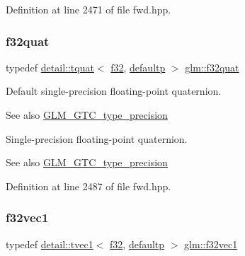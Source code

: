 Definition at line 2471 of file fwd.\+hpp.

\mbox{\label{group__gtc__type__precision_gafc69e0f1b9ac1a001bb4b1b9710d4f92}} 
\subsubsection{\texorpdfstring{f32quat}{f32quat}}
{\footnotesize\ttfamily typedef \hyperlink{structglm_1_1detail_1_1tquat}{detail\+::tquat}$<$ \hyperlink{group__gtc__type__precision_ga0ec999b57f5330d9021256e96038df04}{f32}, \hyperlink{namespaceglm_a0f04f086094c747d227af4425893f545a9d21ccd8b5a009ec7eb7677befc3bf51}{defaultp} $>$ \hyperlink{group__gtc__type__precision_gafc69e0f1b9ac1a001bb4b1b9710d4f92}{glm\+::f32quat}}

Default single-\/precision floating-\/point quaternion. \begin{DoxySeeAlso}{See also}
\hyperlink{group__gtc__type__precision}{G\+L\+M\+\_\+\+G\+T\+C\+\_\+type\+\_\+precision}
\end{DoxySeeAlso}
Single-\/precision floating-\/point quaternion. \begin{DoxySeeAlso}{See also}
\hyperlink{group__gtc__type__precision}{G\+L\+M\+\_\+\+G\+T\+C\+\_\+type\+\_\+precision} 
\end{DoxySeeAlso}


Definition at line 2487 of file fwd.\+hpp.

\mbox{\label{group__gtc__type__precision_ga7335bddf7a09ba275d5d04f7681f03e6}} 
\subsubsection{\texorpdfstring{f32vec1}{f32vec1}}
{\footnotesize\ttfamily typedef \hyperlink{structglm_1_1detail_1_1tvec1}{detail\+::tvec1}$<$ \hyperlink{group__gtc__type__precision_ga0ec999b57f5330d9021256e96038df04}{f32}, \hyperlink{namespaceglm_a0f04f086094c747d227af4425893f545a9d21ccd8b5a009ec7eb7677befc3bf51}{defaultp} $>$ \hyperlink{group__gtc__type__precision_ga7335bddf7a09ba275d5d04f7681f03e6}{glm\+::f32vec1}}

